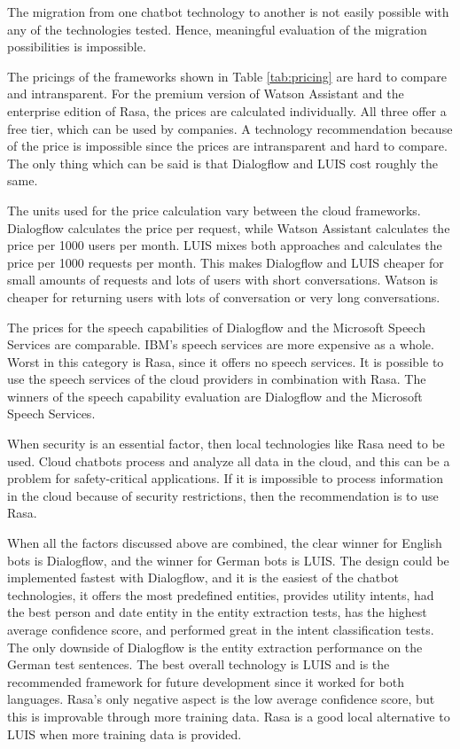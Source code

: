 The migration from one chatbot technology to another is not easily possible with any of the technologies tested. 
Hence, meaningful evaluation of the migration possibilities is impossible.

The pricings of the frameworks shown in Table \ref{tab:pricing} are hard to compare and intransparent.
For the premium version of Watson Assistant and the enterprise edition of Rasa, the prices are calculated individually.
All three offer a free tier, which can be used by companies.
A technology recommendation because of the price is impossible since the prices are intransparent and hard to compare.
The only thing which can be said is that Dialogflow and LUIS cost roughly the same.

The units used for the price calculation vary between the cloud frameworks.
Dialogflow calculates the price per request, while Watson Assistant calculates the price per 1000 users per month.
LUIS mixes both approaches and calculates the price per 1000 requests per month.
This makes Dialogflow and LUIS cheaper for small amounts of requests and lots of users with short conversations.
Watson is cheaper for returning users with lots of conversation or very long conversations.

The prices for the speech capabilities of Dialogflow and the Microsoft Speech Services are comparable.
IBM's speech services are more expensive as a whole.
Worst in this category is Rasa, since it offers no speech services.
It is possible to use the speech services of the cloud providers in combination with Rasa.
The winners of the speech capability evaluation are Dialogflow and the Microsoft Speech Services.

When security is an essential factor, then local technologies like Rasa need to be used.
Cloud chatbots process and analyze all data in the cloud, and this can be a problem for safety-critical applications.
If it is impossible to process information in the cloud because of security restrictions, then the recommendation is to use Rasa.

When all the factors discussed above are combined, the clear winner for English bots is Dialogflow, and the winner for German bots is LUIS.
The design could be implemented fastest with Dialogflow, and it is the easiest of the chatbot technologies,
it offers the most predefined entities, provides utility intents, had the best person and date entity in the entity extraction tests, has the highest average confidence score, and performed great in the intent classification tests.
The only downside of Dialogflow is the entity extraction performance on the German test sentences.
The best overall technology is LUIS and is the recommended framework for future development since it worked for both languages.
Rasa's only negative aspect is the low average confidence score, but this is improvable through more training data.
Rasa is a good local alternative to LUIS when more training data is provided.

